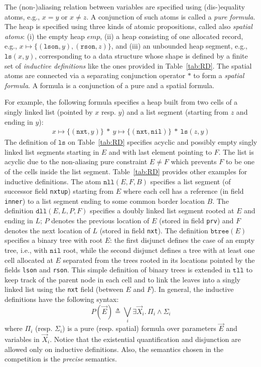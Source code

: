 \documentclass[twoside,11pt]{article}
\newcommand{\sep}{.\,}
\newcommand{\posep}{*}
\newcommand{\points}{\mapsto}
\newcommand{\nil}{\mathtt{nil}}
\newcommand{\ls}{\mathtt{ls}}
\newcommand{\dll}{\mathtt{dll}}
\newcommand{\nll}{\mathtt{nll}}
\begin{document}
The (non-)aliasing relation between variables are specified using (dis-)equality atoms, e.g., $x = y$ or $x\neq z$. A conjunction of such atoms is called a \emph{pure formula}. 
%
The heap is specified using three kinds of atomic propositions, called also \emph{spatial atoms}:
(i) the empty heap $\mathit{emp}$, 
(ii) a heap consisting of one allocated record, e.g., $x \points \{(\texttt{lson},y), (\texttt{rson},z)\}$,
and
(iii) an unbounded heap segment, e.g., $\ls(x,y)$, corresponding to a data structure whose shape is defined by a finite set of \emph{inductive definitions} like the ones provided in Table~\ref{tab:RD}. 
The spatial atoms are connected via a separating conjunction operator $\posep$ to form a \emph{spatial formula}. 
A formula is a conjunction of a pure and a spatial formula.

For example, the following formula specifies a heap built from two cells of a singly linked list
(pointed by $x$ resp. $y$) and a list segment (starting from $z$ and ending in $y$):
\begin{align}
x \points \{(\texttt{nxt},y)\} \ \posep\ y \points \{(\texttt{nxt},\nil)\} \ \posep\ \ls(z,y)
\end{align}
The definition of $\ls$ on Table~\ref{tab:RD} specifies acyclic and possibly empty singly linked list segments starting in $E$ and with last element pointing to $F$.
The list is acyclic due to the non-aliasing pure constraint $E\neq F$ which prevents $F$ to be one of the cells inside the list segment.
%
Table~\ref{tab:RD} provides other examples for inductive definitions.
%
The atom $\nll(E,F,B)$ specifies a list segment (of successor field \texttt{nxtup}) starting from $E$ where each cell has a reference (in field \texttt{inner}) to a list segment ending to some common border location $B$. 
%
The definition $\dll(E,L,P,F)$ specifies a doubly linked list segment rooted at $E$ and ending in $L$; $P$ denotes the previous location of $E$ (stored in field \texttt{prv}) and $F$ denotes the next location of $L$  (stored in field \texttt{nxt}).
%
The definition $\mathtt{btree}(E)$ specifies a binary tree with root $E$:
the first disjunct defines the case of an empty tree, i.e., with $\nil$ root, while the second disjunct defines a tree with at least one cell allocated at $E$ separated from the trees rooted in its locations pointed by the fields \texttt{lson} and \texttt{rson}.
%
This simple definition of binary trees is extended in $\mathtt{tll}$ to keep track of the parent node in each cell and to link the leaves into a singly linked list using the \texttt{nxt} field (between $E$ and $F$).
%
In general, the inductive definitions have the following syntax:
\begin{equation}\label{eq:RD}
P(\vec{E}) \triangleq \bigvee_i \exists \vec{X}_i\sep \Pi_i \land \Sigma_i
\end{equation}
\noindent where $\Pi_i$ (resp. $\Sigma_i$) is a pure (resp. spatial) formula over parameters $\vec{E}$ and variables in $\vec{X}_i$.
Notice that the existential quantification and disjunction are allowed only on inductive definitions. 
Also, the semantics chosen in the competition is the \emph{precise} semantics.
\end{document}
